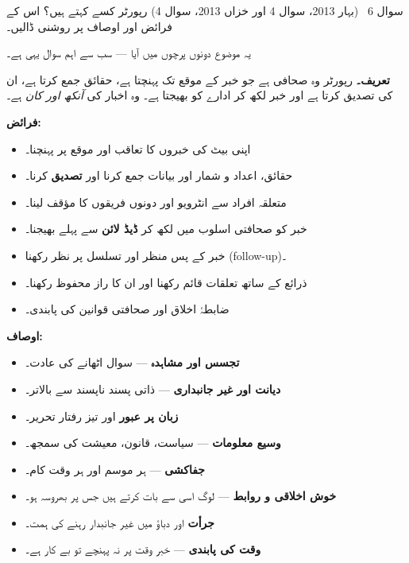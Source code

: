 \begin{sawal}{سوال \textenglish{6} \ \textnormal{\small(بہار \textenglish{2013}، سوال \textenglish{4} اور خزاں \textenglish{2013}، سوال \textenglish{4})}}
رپورٹر کسے کہتے ہیں؟ اس کے فرائض اور اوصاف پر روشنی ڈالیں۔
\end{sawal}

\begin{hal}
یہ موضوع دونوں پرچوں میں آیا --- سب سے اہم سوال یہی ہے۔

\medskip
\textbf{تعریف۔} رپورٹر وہ صحافی ہے جو خبر کے موقع تک پہنچتا ہے، حقائق جمع کرتا
ہے، ان کی تصدیق کرتا ہے اور خبر لکھ کر ادارے کو بھیجتا ہے۔ وہ اخبار کی
\emph{آنکھ اور کان} ہے۔

\medskip
\textbf{فرائض:}
\begin{itemize}\setlength{\itemsep}{1pt}
  \item اپنی بیٹ کی خبروں کا تعاقب اور موقع پر پہنچنا۔
  \item حقائق، اعداد و شمار اور بیانات جمع کرنا اور \textbf{تصدیق} کرنا۔
  \item متعلقہ افراد سے انٹرویو اور دونوں فریقوں کا مؤقف لینا۔
  \item خبر کو صحافتی اسلوب میں لکھ کر \textbf{ڈیڈ لائن} سے پہلے بھیجنا۔
  \item خبر کے پس منظر اور تسلسل پر نظر رکھنا (\textenglish{follow-up})۔
  \item ذرائع کے ساتھ تعلقات قائم رکھنا اور ان کا راز محفوظ رکھنا۔
  \item ضابطۂ اخلاق اور صحافتی قوانین کی پابندی۔
\end{itemize}

\textbf{اوصاف:}
\begin{itemize}\setlength{\itemsep}{1pt}
  \item \textbf{تجسس اور مشاہدہ} --- سوال اٹھانے کی عادت۔
  \item \textbf{دیانت اور غیر جانبداری} --- ذاتی پسند ناپسند سے بالاتر۔
  \item \textbf{زبان پر عبور} اور تیز رفتار تحریر۔
  \item \textbf{وسیع معلومات} --- سیاست، قانون، معیشت کی سمجھ۔
  \item \textbf{جفاکشی} --- ہر موسم اور ہر وقت کام۔
  \item \textbf{خوش اخلاقی و روابط} --- لوگ اسی سے بات کرتے ہیں جس پر بھروسہ ہو۔
  \item \textbf{جرأت} اور دباؤ میں غیر جانبدار رہنے کی ہمت۔
  \item \textbf{وقت کی پابندی} --- خبر وقت پر نہ پہنچے تو بے کار ہے۔
\end{itemize}

\end{hal}

